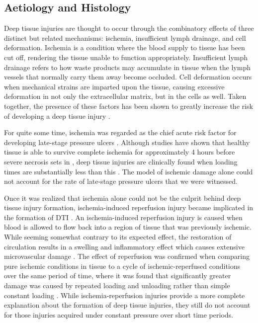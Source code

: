 		\subsection{Aetiology and Histology}
			\label{sec:litreview-aetiology}
			Deep tissue injuries are thought to occur through the combinatory effects of three distinct but related mechanisms: ischemia, insufficient lymph drainage, and cell deformation. Ischemia is a condition where the blood supply to tissue has been cut off, rendering the tissue unable to function appropriately. Insufficient lymph drainage refers to how waste products may accumulate in tissue when the lymph vessels that normally carry them away become occluded. Cell deformation occurs when mechanical strains are imparted upon the tissue, causing excessive deformation in not only the extracellular matrix, but in the cells as well. Taken together, the presence of these factors has been shown to greatly increase the risk of developing a deep tissue injury \cite{stekelenburg08}.

			For quite some time, ischemia was regarded as the chief acute risk factor for developing late-stage pressure ulcers \cite{witkowski82,dinsdale74,kosiak61}. Although studies have shown that healthy tissue is able to survive complete ischemia for approximately 4 hours before severe necrosis sets in \cite{labbe87,strock69}, deep tissue injuries are clinically found when loading times are substantially less than this \cite{aronovitch99,bliss99}. The model of ischemic damage alone could not account for the rate of late-stage pressure ulcers that we were witnessed.

			Once it was realized that ischemia alone could not be the culprit behind deep tissue injury formation, ischemia-induced reperfusion injury became implicated in the formation of DTI \cite{Ytrehus95,Blaisdell02,tsuji05}. An ischemia-induced reperfusion injury is caused when blood is allowed to flow back into a region of tissue that was previously ischemic. While seeming somewhat contrary to its expected effect, the restoration of circulation results in a swelling and inflammatory effect which causes extensive microvascular damage \cite{Blaisdell02}. The effect of reperfusion was confirmed when comparing pure ischemic conditions in tissue to a cycle of ischemic-reperfused conditions over the same period of time, where it was found that significantly greater damage was caused by repeated loading and unloading rather than simple constant loading \cite{tsuji05,salcido94}. While ischemia-reperfusion injuries provide a more complete explanation about the formation of deep tissue injuries, they still do not account for those injuries acquired under constant pressure over short time periods.


